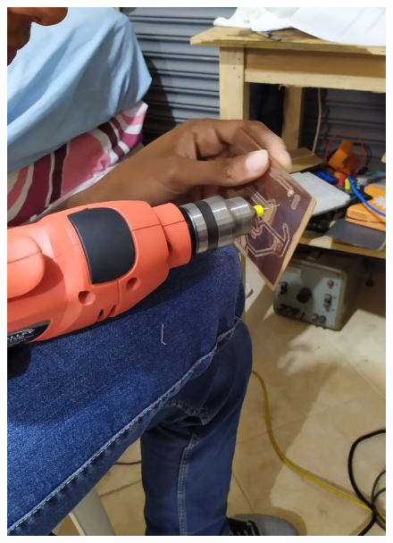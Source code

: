 \documentclass[10pt,a4paper]{article}
\begin{document}
\begin{multicols}{2}
\begin{figure}[H]
\centering
\includegraphics[scale=0.31]{perforar}
\end{figure}
\begin{figure}[H]
\centering

\end{figure}
\end{multicols}
\end{document}
